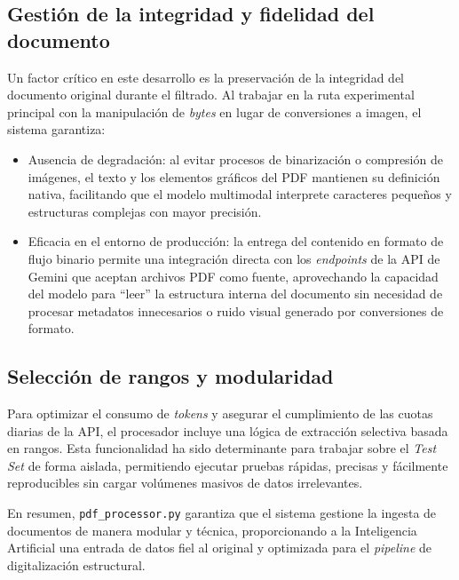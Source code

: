 \subsection{Gestión de la integridad y fidelidad del documento}

Un factor crítico en este desarrollo es la preservación de la integridad del documento original durante el filtrado. Al trabajar en la ruta experimental principal con la manipulación de \textit{bytes} en lugar de conversiones a imagen, el sistema garantiza:

\begin{itemize}
    \item Ausencia de degradación: al evitar procesos de binarización o compresión de imágenes, el texto y los elementos gráficos del PDF mantienen su definición nativa, facilitando que el modelo multimodal interprete caracteres pequeños y estructuras complejas con mayor precisión.

    \item Eficacia en el entorno de producción: la entrega del contenido en formato de flujo binario permite una integración directa con los \textit{endpoints} de la API de Gemini que aceptan archivos PDF como fuente, aprovechando la capacidad del modelo para ``leer'' la estructura interna del documento sin necesidad de procesar metadatos innecesarios o ruido visual generado por conversiones de formato.
\end{itemize}

\subsection{Selección de rangos y modularidad}

Para optimizar el consumo de \textit{tokens} y asegurar el cumplimiento de las cuotas diarias de la API, el procesador incluye una lógica de extracción selectiva basada en rangos. Esta funcionalidad ha sido determinante para trabajar sobre el \textit{Test Set} de forma aislada, permitiendo ejecutar pruebas rápidas, precisas y fácilmente reproducibles sin cargar volúmenes masivos de datos irrelevantes.

En resumen, \texttt{pdf\_processor.py} garantiza que el sistema gestione la ingesta de documentos de manera modular y técnica, proporcionando a la Inteligencia Artificial una entrada de datos fiel al original y optimizada para el \textit{pipeline} de digitalización estructural.





